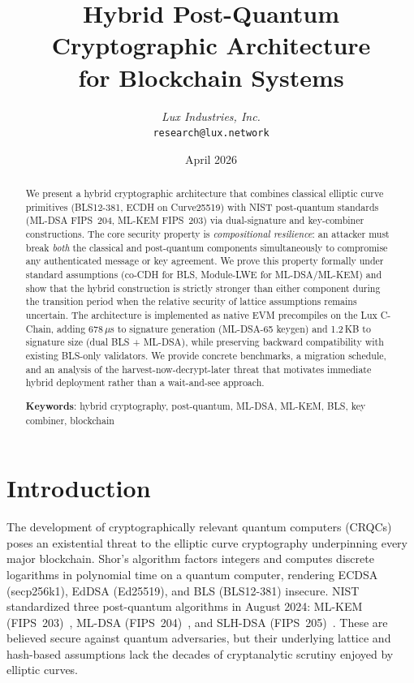 \documentclass[11pt,a4paper]{article}
\title{\textbf{Hybrid Post-Quantum Cryptographic Architecture\\for Blockchain Systems}}
\author{
\textit{Lux Industries, Inc.}\\
\texttt{research@lux.network}
}
\date{April 2026}
\begin{document}
\luxcoverpage

\begin{abstract}
We present a hybrid cryptographic architecture that combines classical elliptic curve
primitives (BLS12-381, ECDH on Curve25519) with NIST post-quantum standards (ML-DSA
FIPS~204, ML-KEM FIPS~203) via dual-signature and key-combiner constructions. The core
security property is \emph{compositional resilience}: an attacker must break \emph{both}
the classical and post-quantum components simultaneously to compromise any authenticated
message or key agreement. We prove this property formally under standard assumptions
(co-CDH for BLS, Module-LWE for ML-DSA/ML-KEM) and show that the hybrid construction
is strictly stronger than either component during the transition period when the
relative security of lattice assumptions remains uncertain. The architecture is
implemented as native EVM precompiles on the Lux C-Chain, adding 678\,$\mu$s to
signature generation (ML-DSA-65 keygen) and 1.2\,KB to signature size (dual BLS +
ML-DSA), while preserving backward compatibility with existing BLS-only validators.
We provide concrete benchmarks, a migration schedule, and an analysis of the
harvest-now-decrypt-later threat that motivates immediate hybrid deployment rather
than a wait-and-see approach.

\textbf{Keywords}: hybrid cryptography, post-quantum, ML-DSA, ML-KEM, BLS,
key combiner, blockchain
\end{abstract}

\tableofcontents
\newpage

\section{Introduction}
\label{sec:introduction}

The development of cryptographically relevant quantum computers (CRQCs) poses an
existential threat to the elliptic curve cryptography underpinning every major
blockchain. Shor's algorithm factors integers and computes discrete logarithms in
polynomial time on a quantum computer, rendering ECDSA (secp256k1), EdDSA (Ed25519),
and BLS (BLS12-381) insecure. NIST standardized three post-quantum algorithms in
August 2024: ML-KEM (FIPS~203)~\cite{fips203}, ML-DSA (FIPS~204)~\cite{fips204},
and SLH-DSA (FIPS~205)~\cite{fips205}. These are believed secure against quantum
adversaries, but their underlying lattice and hash-based assumptions lack the
decades of cryptanalytic scrutiny enjoyed by elliptic curves.
\end{document}
